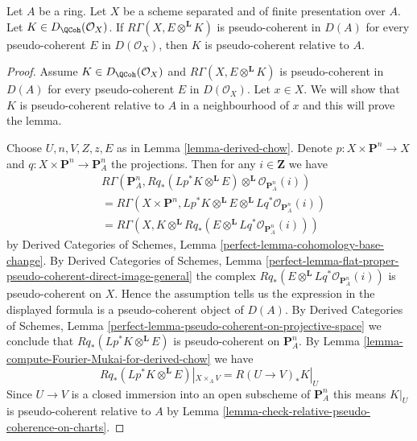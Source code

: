 \begin{lemma}
\label{lemma-characterize-pseudo-coherent}
Let $A$ be a ring. Let $X$ be a scheme separated and
of finite presentation over $A$. Let $K \in D_\QCoh(\mathcal{O}_X)$.
If $R\Gamma(X, E \otimes^\mathbf{L} K)$ is pseudo-coherent
in $D(A)$ for every pseudo-coherent $E$ in $D(\mathcal{O}_X)$,
then $K$ is pseudo-coherent relative to $A$.
\end{lemma}

\begin{proof}
Assume $K \in D_\QCoh(\mathcal{O}_X)$ and
$R\Gamma(X, E \otimes^\mathbf{L} K)$ is pseudo-coherent
in $D(A)$ for every pseudo-coherent $E$ in $D(\mathcal{O}_X)$.
Let $x \in X$. We will show that $K$ is pseudo-coherent relative to $A$
in a neighbourhood of $x$ and this will prove the lemma.

\medskip\noindent
Choose $U, n, V, Z, z, E$ as in Lemma \ref{lemma-derived-chow}.
Denote $p : X \times \mathbf{P}^n \to X$ and
$q : X \times \mathbf{P}^n \to \mathbf{P}^n_A$
the projections.
Then for any $i \in \mathbf{Z}$ we have
\begin{align*}
& R\Gamma(\mathbf{P}^n_A,
Rq_*(Lp^*K \otimes^\mathbf{L} E)
\otimes^\mathbf{L}
\mathcal{O}_{\mathbf{P}^n_A}(i)) \\
& =
R\Gamma(X \times \mathbf{P}^n,
Lp^*K \otimes^\mathbf{L} E \otimes^\mathbf{L}
Lq^*\mathcal{O}_{\mathbf{P}^n_A}(i)) \\
& =
R\Gamma(X,
K \otimes^\mathbf{L} Rq_*(E \otimes^\mathbf{L}
Lq^*\mathcal{O}_{\mathbf{P}^n_A}(i)))
\end{align*}
by 
Derived Categories of Schemes,
Lemma \ref{perfect-lemma-cohomology-base-change}.
By
Derived Categories of Schemes,
Lemma \ref{perfect-lemma-flat-proper-pseudo-coherent-direct-image-general}
the complex $Rq_*(E \otimes^\mathbf{L} Lq^*\mathcal{O}_{\mathbf{P}^n_A}(i))$
is pseudo-coherent on $X$. Hence the assumption tells us the expression
in the displayed formula is a pseudo-coherent object of $D(A)$.
By
Derived Categories of Schemes,
Lemma \ref{perfect-lemma-pseudo-coherent-on-projective-space}
we conclude that $Rq_*(Lp^*K \otimes^\mathbf{L} E)$ is
pseudo-coherent on $\mathbf{P}^n_A$.
By Lemma \ref{lemma-compute-Fourier-Mukai-for-derived-chow}
we have
$$
Rq_*(Lp^*K \otimes^\mathbf{L} E)|_{X \times_A V} =
R(U \to V)_*K|_U
$$
Since $U \to V$ is a closed immersion into an open subscheme of
$\mathbf{P}^n_A$ this means $K|_U$ is pseudo-coherent relative to $A$
by Lemma \ref{lemma-check-relative-pseudo-coherence-on-charts}.
\end{proof}

